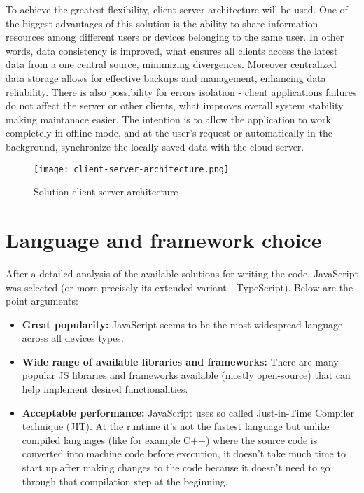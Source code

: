 To achieve the greatest flexibility, client-server architecture will be used. One of the biggest advantages of this solution is the ability to share information resources among different users or devices belonging to the same user. In other words, data consistency is improved, what ensures all clients access the latest data from a one central source, minimizing divergences. Moreover centralized data storage allows for effective backups and management, enhancing data reliability. There is also possibility for errors isolation - client applications failures do not affect the server or other clients, what improves overall system stability making maintanace easier.
The intention is to allow the application to work completely in offline mode, and at the user's request or automatically in the background, synchronize the locally saved data with the cloud server. 

\begin{figure}[H]
    \centering
    \texttt{[image: client-server-architecture.png]}
    \caption[Solution Architecture]{\label{fig:architecture} Solution client-server architecture }
\end{figure}

 

\section{{Language and framework choice}}

After a detailed analysis of the available solutions for writing the code, JavaScript was selected (or more precisely its extended variant - TypeScript). Below are the point arguments:

\begin{itemize}
  \item \textbf{Great popularity:} JavaScript seems to be the most widespread language across all devices types.
  \item \textbf{Wide range of available libraries and frameworks:} There are many popular JS libraries and frameworks available (mostly open-source) that can help implement desired functionalities.
  \item \textbf{Acceptable performance:} JavaScript uses so called Just-in-Time Compiler technique (JIT)\autocite{JIT}. At the runtime it's not the fastest language but unlike compiled languages (like for example C++) where the source code is converted into machine code before execution, it doesn't take much time to start up after making changes to the code because it doesn't need to go through that compilation step at the beginning.
\end{itemize}

